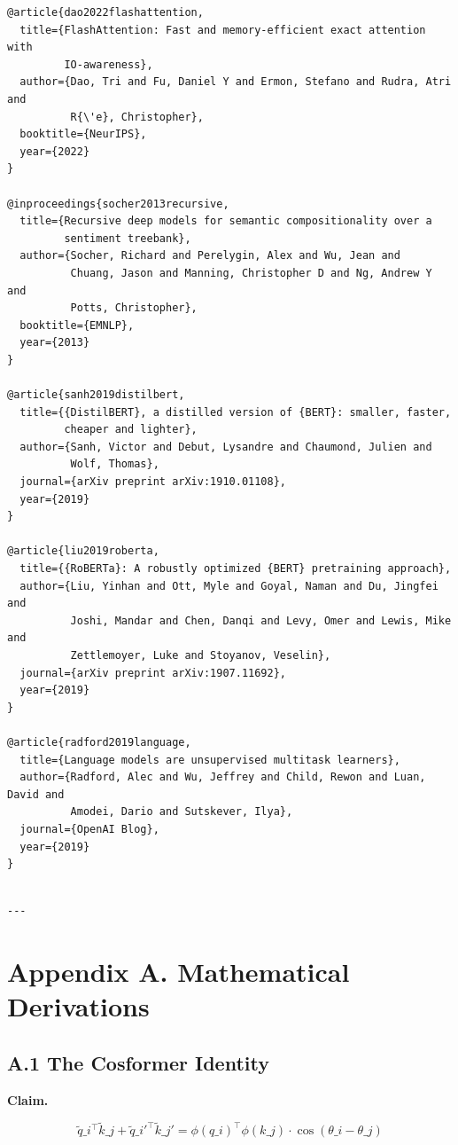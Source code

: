 \begin{lstlisting}
@article{dao2022flashattention,
  title={FlashAttention: Fast and memory-efficient exact attention with 
         IO-awareness},
  author={Dao, Tri and Fu, Daniel Y and Ermon, Stefano and Rudra, Atri and 
          R{\'e}, Christopher},
  booktitle={NeurIPS},
  year={2022}
}

@inproceedings{socher2013recursive,
  title={Recursive deep models for semantic compositionality over a 
         sentiment treebank},
  author={Socher, Richard and Perelygin, Alex and Wu, Jean and 
          Chuang, Jason and Manning, Christopher D and Ng, Andrew Y and 
          Potts, Christopher},
  booktitle={EMNLP},
  year={2013}
}

@article{sanh2019distilbert,
  title={{DistilBERT}, a distilled version of {BERT}: smaller, faster, 
         cheaper and lighter},
  author={Sanh, Victor and Debut, Lysandre and Chaumond, Julien and 
          Wolf, Thomas},
  journal={arXiv preprint arXiv:1910.01108},
  year={2019}
}

@article{liu2019roberta,
  title={{RoBERTa}: A robustly optimized {BERT} pretraining approach},
  author={Liu, Yinhan and Ott, Myle and Goyal, Naman and Du, Jingfei and 
          Joshi, Mandar and Chen, Danqi and Levy, Omer and Lewis, Mike and 
          Zettlemoyer, Luke and Stoyanov, Veselin},
  journal={arXiv preprint arXiv:1907.11692},
  year={2019}
}

@article{radford2019language,
  title={Language models are unsupervised multitask learners},
  author={Radford, Alec and Wu, Jeffrey and Child, Rewon and Luan, David and 
          Amodei, Dario and Sutskever, Ilya},
  journal={OpenAI Blog},
  year={2019}
}
\end{lstlisting}
\begin{lstlisting}

---
\end{lstlisting}


\section{Appendix A. Mathematical Derivations}

\subsection{A.1 The Cosformer Identity}

\textbf{Claim.}

\[
\tilde{q}\_i^\top \tilde{k}\_j + \tilde{q}\_i'^\top \tilde{k}\_j' = \phi(q\_i)^\top \phi(k\_j) \cdot \cos(\theta\_i - \theta\_j)
\]


